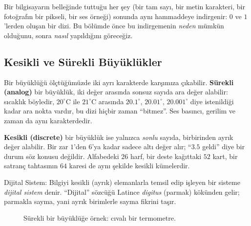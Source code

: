 Bir bilgisayarın belleğinde tuttuğu her şey (bir tam sayı, bir metin karakteri, bir
fotoğrafın bir pikseli, bir ses örneği) sonunda aynı hammaddeye indirgenir: $0$ ve $1$'lerden
oluşan bir dizi. Bu bölümde önce bu indirgemenin \emph{neden} mümkün olduğunu, sonra
\emph{nasıl} yapıldığını göreceğiz.

\subsection{Kesikli ve Sürekli Büyüklükler}
\label{sec:kesikli-surekli}

Bir büyüklüğü ölçtüğümüzde iki ayrı karakterde karşımıza çıkabilir. \textbf{Sürekli
(analog)} bir büyüklük, iki değer arasında sonsuz sayıda ara
değer alabilir: sıcaklık böyledir, $20^\circ$C ile $21^\circ$C arasında $20.1^\circ$,
$20.01^\circ$, $20.001^\circ$ diye istenildiği kadar ara nokta vardır, bu dizi hiçbir zaman
``bitmez''. Ses basıncı, gerilim ve zaman da aynı karakterdedir.

\textbf{Kesikli (discrete)} bir büyüklük ise yalnızca
\emph{sonlu} sayıda, birbirinden ayrık değer alabilir. Bir zar $1$'den $6$'ya kadar sadece
altı değer alır; ``$3.5$ geldi'' diye bir durum söz konusu değildir. Alfabedeki $26$ harf, bir
deste kağıttaki $52$ kart, bir satranç tahtasının $64$ karesi de aynı şekilde kesikli
kümelerdir.

\begin{tanim}{Dijital Sistem:}
Bilgiyi kesikli (ayrık) elemanlarla temsil edip işleyen bir sisteme \emph{dijital
sistem} denir. ``Dijital'' sözcüğü Latince \emph{digitus} (parmak)
kökünden gelir; parmakla sayma, yani ayrık birimlerle sayma fikrini taşır.
\end{tanim}

\begin{figure}[H]
\centering
{}
\caption{Sürekli bir büyüklüğe örnek: cıvalı bir termometre.}
\label{fig:termometre-surekli}
\end{figure}

